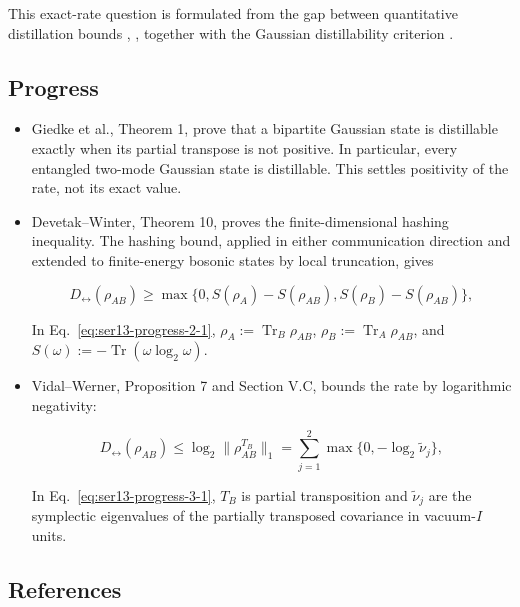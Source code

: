 This exact-rate question is formulated from the gap between quantitative distillation bounds , , together with the Gaussian distillability criterion .

\subsection*{Progress}

\begin{itemize}
  \item Giedke et al., Theorem 1, prove that a bipartite Gaussian state is distillable exactly when its partial transpose is not positive. In particular, every entangled two-mode Gaussian state is distillable. This settles positivity of the rate, not its exact value. 

  \item Devetak--Winter, Theorem 10, proves the finite-dimensional hashing inequality. The hashing bound, applied in either communication direction and extended to finite-energy bosonic states by local truncation, gives

\begin{equation}
D_{\leftrightarrow}(\rho_{AB})\geq\max\{0,S(\rho_A)-S(\rho_{AB}),S(\rho_B)-S(\rho_{AB})\},
\label{eq:ser13-progress-2-1}
\end{equation}

In Eq.~\eqref{eq:ser13-progress-2-1}, $\rho_A:=\operatorname{Tr}_B\rho_{AB}$, $\rho_B:=\operatorname{Tr}_A\rho_{AB}$, and $S(\omega):=-\operatorname{Tr}(\omega\log_2\omega)$. 

  \item Vidal--Werner, Proposition 7 and Section V.C, bounds the rate by logarithmic negativity:

\begin{equation}
D_{\leftrightarrow}(\rho_{AB})\leq\log_2\lVert\rho_{AB}^{T_B}\rVert_1
=\sum_{j=1}^2\max\{0,-\log_2\widetilde\nu_j\},
\label{eq:ser13-progress-3-1}
\end{equation}

In Eq.~\eqref{eq:ser13-progress-3-1}, $T_B$ is partial transposition and $\widetilde\nu_j$ are the symplectic eigenvalues of the partially transposed covariance in vacuum-$I$ units. 
\end{itemize}

\subsection*{References}

